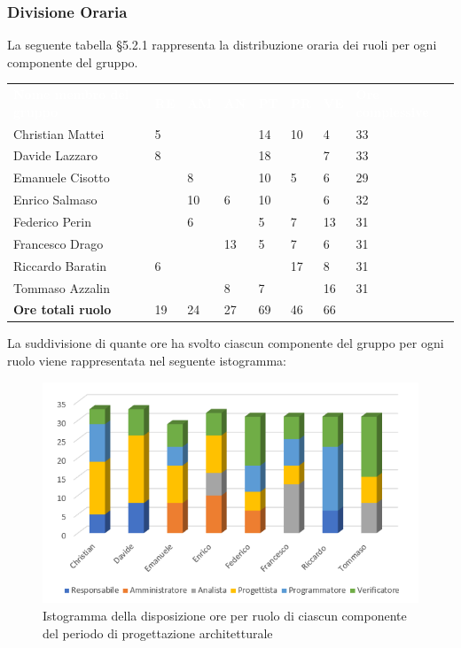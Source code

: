 \subsubsection{Divisione Oraria}
La seguente tabella §5.2.1 rappresenta la distribuzione oraria dei ruoli per ogni componente del gruppo.
{
	\renewcommand{\arraystretch}{2}
	\centering
	\begin{longtable}{ C{5cm} C{1cm} C{1cm} C{1cm} C{1cm} C{1cm} C{1cm} C{3cm}}
		\textcolor{white}{\textbf{Nome membro del gruppo}} & \textcolor{white}{\textbf{RE}} & \textcolor{white}{\textbf{AM}} & \textcolor{white}{\textbf{AN}} & \textcolor{white}{\textbf{PT}} & \textcolor{white}{\textbf{PR}} & \textcolor{white}{\textbf{VE}} & \textcolor{white}{\textbf{Ore complessive}}\\	
        
        Christian Mattei & 5 & & & 14 & 10 & 4 & 33\\
        Davide Lazzaro & 8 & & & 18 & & 7 & 33 \\
        Emanuele Cisotto & & 8 & & 10 & 5 & 6 & 29 \\
        Enrico Salmaso & & 10 & 6 & 10 & & 6 & 32 \\
        Federico Perin & & 6 & & 5 & 7 & 13 &  31\\
        Francesco Drago & & & 13 & 5 & 7 & 6 & 31 \\
        Riccardo Baratin & 6 & & & & 17 & 8 & 31\\
        Tommaso Azzalin & & & 8 & 7 & & 16 & 31\\
        \textbf{Ore totali ruolo} & 19 & 24 & 27 & 69 & 46 & 66 & \\
		
	\end{longtable}
}

La suddivisione di quante ore ha svolto ciascun componente del gruppo per ogni ruolo viene rappresentata nel seguente istogramma:

\begin{figure}[h]
	\centering
	\includegraphics[scale=3]{sezioni/Istogrammi/IstogrammaProgettArchitetturale.png}
	\caption{Istogramma della disposizione ore per ruolo di ciascun componente del periodo di progettazione architetturale}
\end{figure}

